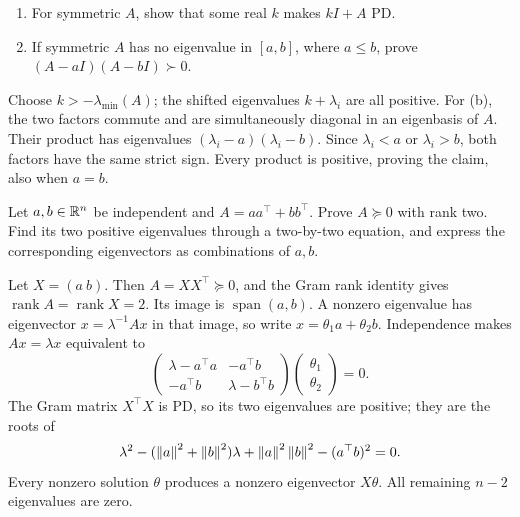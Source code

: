 \begin{problem}\label{ex:09:kato}
\begin{enumerate}
\item For symmetric \(A\), show that some real \(k\) makes \(kI+A\) PD.
\item If symmetric \(A\) has no eigenvalue in \([a,b]\), where \(a\leqslant b\),
prove \((A-aI)(A-bI)\succ0\).
\end{enumerate}
\end{problem}
\begin{solution}
Choose \(k>-\lambda_{\min}(A)\); the shifted eigenvalues \(k+\lambda_i\)
are all positive.
For (b), the two factors commute and are simultaneously diagonal in an
eigenbasis of \(A\). Their product has eigenvalues
\((\lambda_i-a)(\lambda_i-b)\).
Since \(\lambda_i<a\) or \(\lambda_i>b\), both factors have the same
strict sign. Every product is positive, proving the claim, also when
\(a=b\).
\end{solution}

\begin{problem}\label{ex:09:rank-two-plus}
Let \(a,b\in\mathbb R^n\) be independent and \(A=aa^\top+bb^\top\).
Prove \(A\succeq0\) with rank two. Find its two positive eigenvalues
through a two-by-two equation, and express the corresponding eigenvectors
as combinations of \(a,b\).
\end{problem}
\begin{solution}
Let \(X=(a\ b)\). Then \(A=XX^\top\succeq0\), and the Gram rank identity
gives \(\operatorname{rank}A=\operatorname{rank}X=2\).
Its image is \(\operatorname{span}(a,b)\). A nonzero eigenvalue has
eigenvector \(x=\lambda^{-1}Ax\) in that image, so write
\(x=\theta_1a+\theta_2b\).
Independence makes \(Ax=\lambda x\) equivalent to
\[
 \begin{pmatrix}\lambda-a^\top a&-a^\top b\\
                 -a^\top b&\lambda-b^\top b\end{pmatrix}
 \begin{pmatrix}\theta_1\\\theta_2\end{pmatrix}=0.
\]
The Gram matrix \(X^\top X\) is PD, so its two eigenvalues are positive;
they are the roots of
\[
 \lambda^2-(\left\lVert a\right\rVert^2+\left\lVert b\right\rVert^2)\lambda
 +\left\lVert a\right\rVert^2\left\lVert b\right\rVert^2-(a^\top b)^2=0.
\]
Every nonzero solution \(\theta\) produces a nonzero eigenvector \(X\theta\).
All remaining \(n-2\) eigenvalues are zero.
\end{solution}

